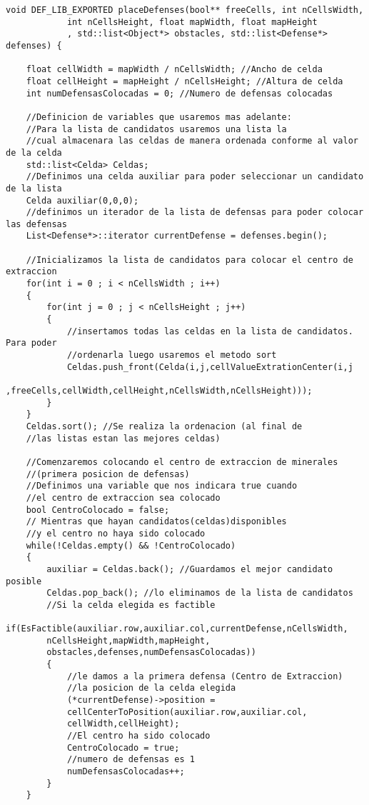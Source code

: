 \begin{lstlisting}[frame=single,basicstyle=\tiny,title={Voraz para el centro de extracción}]
void DEF_LIB_EXPORTED placeDefenses(bool** freeCells, int nCellsWidth, 
			int nCellsHeight, float mapWidth, float mapHeight
            , std::list<Object*> obstacles, std::list<Defense*> defenses) {
	
    float cellWidth = mapWidth / nCellsWidth; //Ancho de celda
    float cellHeight = mapHeight / nCellsHeight; //Altura de celda
    int numDefensasColocadas = 0; //Numero de defensas colocadas

	//Definicion de variables que usaremos mas adelante:
	//Para la lista de candidatos usaremos una lista la 
	//cual almacenara las celdas de manera ordenada conforme al valor de la celda
	std::list<Celda> Celdas;
	//Definimos una celda auxiliar para poder seleccionar un candidato de la lista
	Celda auxiliar(0,0,0);
	//definimos un iterador de la lista de defensas para poder colocar las defensas
	List<Defense*>::iterator currentDefense = defenses.begin();
		
	//Inicializamos la lista de candidatos para colocar el centro de extraccion
	for(int i = 0 ; i < nCellsWidth ; i++)
	{
		for(int j = 0 ; j < nCellsHeight ; j++)
		{
			//insertamos todas las celdas en la lista de candidatos. Para poder 
			//ordenarla luego usaremos el metodo sort
			Celdas.push_front(Celda(i,j,cellValueExtrationCenter(i,j
			,freeCells,cellWidth,cellHeight,nCellsWidth,nCellsHeight)));
		}
	}
	Celdas.sort(); //Se realiza la ordenacion (al final de 
	//las listas estan las mejores celdas)

	//Comenzaremos colocando el centro de extraccion de minerales 
	//(primera posicion de defensas)
	//Definimos una variable que nos indicara true cuando 
	//el centro de extraccion sea colocado
	bool CentroColocado = false; 
	// Mientras que hayan candidatos(celdas)disponibles 
	//y el centro no haya sido colocado
	while(!Celdas.empty() && !CentroColocado) 
	{
		auxiliar = Celdas.back(); //Guardamos el mejor candidato posible
		Celdas.pop_back(); //lo eliminamos de la lista de candidatos
		//Si la celda elegida es factible
		if(EsFactible(auxiliar.row,auxiliar.col,currentDefense,nCellsWidth,
		nCellsHeight,mapWidth,mapHeight,
		obstacles,defenses,numDefensasColocadas))  
		{
			//le damos a la primera defensa (Centro de Extraccion) 
			//la posicion de la celda elegida
			(*currentDefense)->position = 
			cellCenterToPosition(auxiliar.row,auxiliar.col,
			cellWidth,cellHeight); 
			//El centro ha sido colocado
			CentroColocado = true; 
			//numero de defensas es 1
			numDefensasColocadas++; 
		}
	}
\end{lstlisting}
